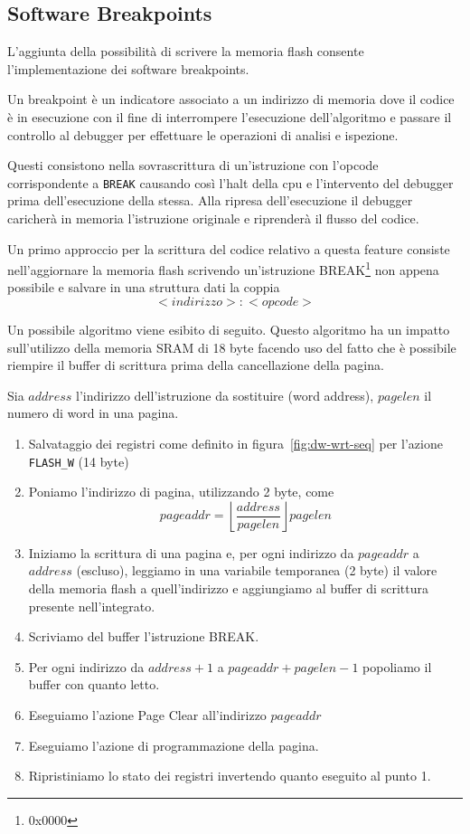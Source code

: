 \subsection{Software Breakpoints}

L'aggiunta della possibilità di scrivere la memoria flash consente l'implementazione dei software breakpoints.

Un breakpoint è un indicatore associato a un indirizzo di memoria dove il codice è in esecuzione con il fine di interrompere l'esecuzione dell'algoritmo e passare il controllo al debugger per effettuare le operazioni di analisi e ispezione.

Questi consistono nella sovrascrittura di un'istruzione con l'opcode corrispondente a \texttt{BREAK} causando così l'halt della cpu e l'intervento del debugger prima dell'esecuzione della stessa.
Alla ripresa dell'esecuzione il debugger caricherà in memoria l'istruzione originale e riprenderà il flusso del codice.

Un primo approccio per la scrittura del codice relativo a questa feature consiste nell'aggiornare la memoria flash scrivendo un'istruzione BREAK\footnote{0x0000} non appena possibile e salvare in una struttura dati la coppia \[<indirizzo>:<opcode>\]

Un possibile algoritmo viene esibito di seguito. Questo algoritmo ha un impatto sull'utilizzo della memoria SRAM di 18 byte facendo uso del fatto che è possibile riempire il buffer di scrittura prima della cancellazione della pagina.

Sia \(address\) l'indirizzo dell'istruzione da sostituire (word address), \(pagelen\) il numero di word in una pagina.

\begin{enumerate}
    \item Salvataggio dei registri come definito in figura~\ref{fig:dw-wrt-seq} per l'azione \texttt{FLASH\_W} (14 byte)
    \item Poniamo l'indirizzo di pagina, utilizzando 2 byte, come \[pageaddr = \left\lfloor\frac{address}{pagelen}\right\rfloor pagelen\] 
    \item Iniziamo la scrittura di una pagina e, per ogni indirizzo da \(pageaddr\) a \(address\) (escluso), leggiamo in una variabile temporanea (2 byte) il valore della memoria flash a quell'indirizzo e aggiungiamo al buffer di scrittura presente nell'integrato.
    \item Scriviamo del buffer l'istruzione BREAK.\@ 
    \item Per ogni indirizzo da \(address + 1\) a \(pageaddr + pagelen - 1\) popoliamo il buffer con quanto letto. 
    \item Eseguiamo l'azione Page Clear all'indirizzo \(pageaddr\)
    \item Eseguiamo l'azione di programmazione della pagina.
    \item Ripristiniamo lo stato dei registri invertendo quanto eseguito al punto 1.
\end{enumerate}

